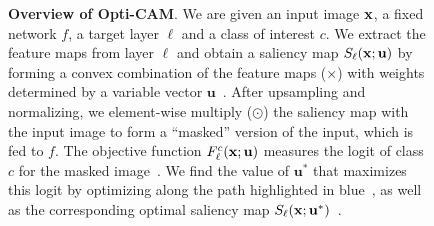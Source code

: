 \begin{figure}[t]
{
    }
\caption{\textbf{Overview of Opti-CAM}. We are given an input image $\mathbf{x}$, a fixed network $f$, a target layer $\ell$ and a class of interest $c$. We extract the feature maps from layer $\ell$ and obtain a saliency map $S_\ell(\mathbf{x}; \mathbf{u})$ by forming a convex combination of the feature maps ($\times$) with weights determined by a variable vector $\mathbf{u}$~. After upsampling and normalizing, we element-wise multiply ($\odot$) the saliency map with the input image to form a ``masked'' version of the input, which is fed to $f$. The objective function $F^c_\ell(\mathbf{x}; \mathbf{u})$ measures the logit of class $c$ for the masked image~. We find the value of $\mathbf{u}^*$ that maximizes this logit by optimizing along the path highlighted in blue~, as well as the corresponding optimal saliency map $S_\ell(\mathbf{x}; \mathbf{u}^*)$~.}
\label{fig:idea}
\vspace{-0.4cm}
\end{figure}